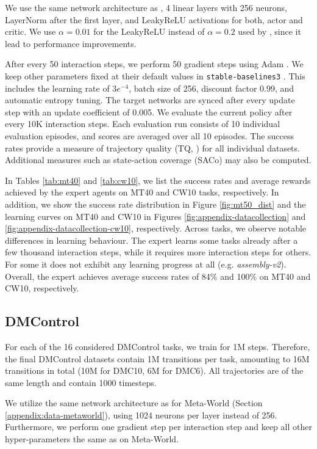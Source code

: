 We use the same network architecture as \citet{Wolczyk:21}, 4 linear layers with 256 neurons,  LayerNorm \citep{Ba:16} after the first layer, and LeakyReLU \citep{Maas:13} activations for both, actor and critic. We use $\alpha=0.01$ for the LeakyReLU instead of $\alpha=0.2$ used by \citet{Wolczyk:21}, since it lead to performance improvements.

After every 50 interaction steps, we perform 50 gradient steps using Adam \citep{Kingma:14}. We keep other parameters fixed at their default values in \texttt{stable-baselines3} \citep{Raffin:21}. This includes the learning rate of $3e^{-4}$, batch size of 256, discount factor 0.99, and automatic entropy tuning. The target networks are synced after every update step with an update coefficient of 0.005. We evaluate the current policy after every 10K interaction steps. Each evaluation run consists of 10 individual evaluation episodes, and scores are averaged over all 10 episodes. The success rates provide a measure of trajectory quality (TQ, \citealp{Schweighofer:22}) for all individual datasets. Additional measures such as state-action coverage (SACo) may also be computed.

In Tables \ref{tab:mt40} and \ref{tab:cw10}, we list the success rates and average rewards achieved by the expert agents on MT40 and CW10 tasks, respectively. In addition, we show the success rate distribution in Figure \ref{fig:mt50_dist}  and the learning curves on MT40 and CW10 in Figures \ref{fig:appendix-datacollection} and \ref{fig:appendix-datacollection-cw10}, respectively.
Across tasks, we observe notable differences in learning behaviour. The expert learns some tasks already after a few thousand interaction steps, while it requires more interaction steps for others. For some it does not exhibit any learning progress at all (e.g. \emph{assembly-v2}).  Overall, the expert achieves average success rates of 84\% and 100\% on MT40 and CW10, respectively.

\subsection{DMControl}
For each of the 16 considered DMControl tasks, we train for 1M steps. Therefore, the final DMControl datasets contain 1M transitions per task, amounting to 16M transitions in total (10M for DMC10, 6M for DMC6). All trajectories are of the same length and contain 1000 timesteps.

We utilize the same network architecture as for Meta-World (Section \ref{appendix:data-metaworld}), using 1024 neurons per layer instead of 256. Furthermore, we perform one gradient step per interaction step and keep all other hyper-parameters the same as on Meta-World.

